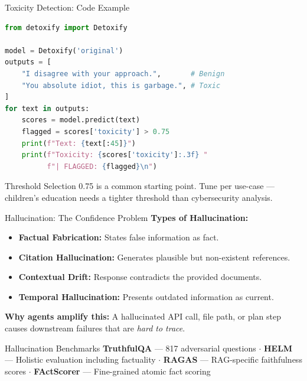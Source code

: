 \documentclass{beamer}       %
\begin{document}
\begin{frame}[fragile]{Toxicity Detection: Code Example}
\begin{lstlisting}[language=Python, caption={Using Detoxify for local inference}]
from detoxify import Detoxify

model = Detoxify('original')
outputs = [
    "I disagree with your approach.",       # Benign
    "You absolute idiot, this is garbage.", # Toxic
]
for text in outputs:
    scores = model.predict(text)
    flagged = scores['toxicity'] > 0.75
    print(f"Text: {text[:45]}")
    print(f"Toxicity: {scores['toxicity']:.3f} "
          f"| FLAGGED: {flagged}\n")
\end{lstlisting}
    \begin{alertblock}{Threshold Selection}
        \footnotesize 0.75 is a common starting point. Tune per use-case --- children's education needs a tighter threshold than cybersecurity analysis.
    \end{alertblock}
\end{frame}

\begin{frame}{Hallucination: The Confidence Problem}
    \small
    \textbf{Types of Hallucination:}
    \begin{itemize}
        \item \textbf{Factual Fabrication:} States false information as fact.
        \item \textbf{Citation Hallucination:} Generates plausible but non-existent references.
        \item \textbf{Contextual Drift:} Response contradicts the provided documents.
        \item \textbf{Temporal Hallucination:} Presents outdated information as current.
    \end{itemize}
    \vspace{0.2cm}
    \textbf{Why agents amplify this:} A hallucinated API call, file path, or plan step causes downstream failures that are \textit{hard to trace}.
    \vfill
    \begin{block}{Hallucination Benchmarks}
        \footnotesize
        \textbf{TruthfulQA} --- 817 adversarial questions $\cdot$
        \textbf{HELM} --- Holistic evaluation including factuality $\cdot$
        \textbf{RAGAS} --- RAG-specific faithfulness scores $\cdot$
        \textbf{FActScorer} --- Fine-grained atomic fact scoring
    \end{block}
\end{frame}
\end{document}
